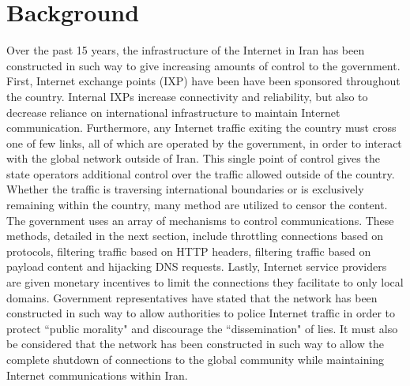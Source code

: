 \section{Background}\label{sec:background}

Over the past 15 years, the infrastructure of the Internet in Iran has been constructed in such way to give increasing amounts of control to the government. First, Internet exchange points (IXP) have been have been sponsored throughout the country. Internal IXPs increase connectivity and reliability, but also to decrease reliance on international infrastructure to maintain Internet communication. Furthermore, any Internet traffic exiting the country must cross one of few links, all of which are operated by the government, in order to interact with the global network outside of Iran. This single point of control gives the state operators additional control over the traffic allowed outside of the country. Whether the traffic is traversing international boundaries or is exclusively remaining within the country, many method are utilized to censor the content. \\
The government uses an array of mechanisms to control communications. These methods, detailed in the next section, include throttling connections based on protocols, filtering traffic based on HTTP headers, filtering traffic based on payload content and hijacking DNS requests. Lastly, Internet service providers are given monetary incentives to limit the connections they facilitate to only local domains. Government representatives have stated that the network has been constructed in such way to allow authorities to police Internet traffic in order to protect ``public morality" and discourage the ``dissemination" of lies. It must also be considered that the network has been constructed in such way to allow the complete shutdown of connections to the global community while maintaining Internet communications within Iran.

